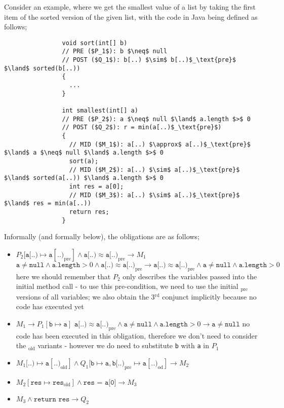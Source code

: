 \documentclass[a4paper, 12pt]{article}
\begin{document}
            Consider an example, where we get the smallest value of a list by taking the first item of the sorted version of the given list, with the code in Java being defined as follows;
            \begin{lstlisting}
                void sort(int[] b)
                // PRE ($P_1$): b $\neq$ null
                // POST ($Q_1$): b[..) $\sim$ b[..)$_\text{pre}$ $\land$ sorted(b[..))
                {
                  ...
                }

                int smallest(int[] a)
                // PRE ($P_2$): a $\neq$ null $\land$ a.length $>$ 0
                // POST ($Q_2$): r = min(a[..)$_\text{pre}$)
                {
                  // MID ($M_1$): a[..) $\approx$ a[..)$_\text{pre}$ $\land$ a $\neq$ null $\land$ a.length $>$ 0
                  sort(a);
                  // MID ($M_2$): a[..) $\sim$ a[..)$_\text{pre}$ $\land$ sorted(a[..)) $\land$ a.length $>$ 0
                  int res = a[0];
                  // MID ($M_3$): a[..) $\sim$ a[..)$_\text{pre}$ $\land$ res = min(a[..))
                  return res;
                }
            \end{lstlisting}
            Informally (and formally below), the obligations are as follows;
            \begin{itemize}
                \itemsep0em
                \item $P_2[\texttt{a}[..) \mapsto \texttt{a}[..)_\text{pre}] \land \texttt{a}[..) \approx \texttt{a}[..)_\text{pre} \rightarrow M_1$
                    \subitem $\texttt{a} \neq \texttt{null} \land \texttt{a.length} > 0 \land \texttt{a}[..) \approx \texttt{a}[..)_\text{pre} \rightarrow \texttt{a}[..) \approx \texttt{a}[..)_\text{pre} \land \texttt{a} \neq \texttt{null} \land \texttt{a.length} > 0$
                    \subitem here we should remember that $P_2$ only describes the variables passed into the initial method call - to use this pre-condition, we need to use the initial $_\text{pre}$ versions of all variables; we also obtain the 3$^\text{rd}$ conjunct implicitly because no code has executed yet
                \item $M_1 \rightarrow P_1[\texttt{b} \mapsto \texttt{a}]$
                    \subitem $\texttt{a}[..) \approx \texttt{a}[..)_\text{pre} \land \texttt{a} \neq \texttt{null} \land \texttt{a.length} > 0 \rightarrow \texttt{a} \neq \texttt{null}$
                    \subitem no code has been executed in this obligation, therefore we don't need to consider the $_\text{old}$ variants - however we do need to substitute \texttt{b} with \texttt{a} in $P_1$
                \item $M_1[..) \mapsto \texttt{a}[..)_\text{old}] \land Q_1[\texttt{b} \mapsto \texttt{a}, \texttt{b}[..)_\text{pre} \mapsto \texttt{a}[..)_\text{od}] \rightarrow M_2$
                \item $M_2[\texttt{res} \mapsto \texttt{res}_\text{old}] \land \texttt{res = a[0]} \rightarrow M_3$
                \item $M_3 \land \texttt{return res} \rightarrow Q_2$
            \end{itemize}
\end{document}
